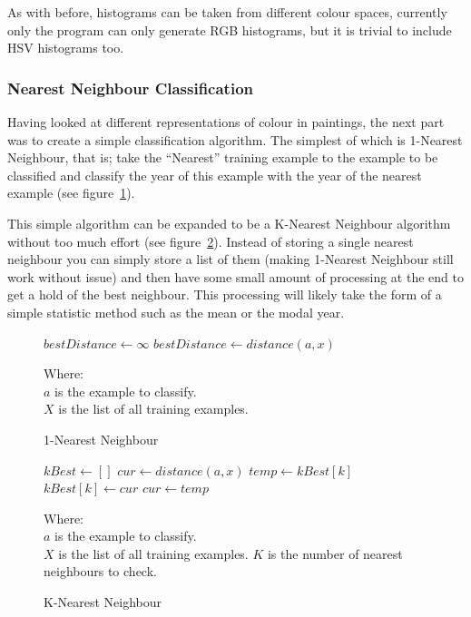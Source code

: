 \documentclass[11pt,fleqn,twoside]{article}
\begin{document}
As with before, histograms can be taken from different colour spaces, currently only the program
can only generate RGB histograms, but it is trivial to include HSV histograms too.

\subsubsection{Nearest Neighbour Classification}
Having looked at different representations of colour in paintings, the next part was to create a 
simple classification algorithm. The simplest of which is 1-Nearest Neighbour, that is; take the 
``Nearest'' training example to the example to be classified and classify the year of this example 
with the year of the nearest example (see figure~\ref{fig:1-nn}).

This simple algorithm can be expanded to be a K-Nearest Neighbour algorithm without too much effort
(see figure~\ref{fig:k-nn}). Instead of storing a single nearest neighbour you can simply store a
list of them (making 1-Nearest Neighbour still work without issue) and then have some small amount
of processing at the end to get a hold of the best neighbour. This processing will likely take the
form of a simple statistic method such as the mean or the modal year.

\begin{figure}[h]
\begin{algorithmic}
\State $bestDistance \gets \infty$
		\State $bestDistance \gets distance(a, x)$
	\EndIf
\EndFor
\end{algorithmic}

Where:\\
\(a\) is the example to classify.\\
\(X\) is the list of all training examples.
\caption{1-Nearest Neighbour}
\label{fig:1-nn}
\end{figure}

\begin{figure}[h]
\begin{algorithmic}
\State $kBest \gets []$
	\State $cur \gets distance(a, x)$
			\State $temp \gets kBest[k]$
			\State $kBest[k] \gets cur$
			\State $cur \gets temp$
		\EndIf
	\EndFor
\EndFor
\end{algorithmic}
Where:\\
$a$ is the example to classify.\\
$X$ is the list of all training examples.
$K$ is the number of nearest neighbours to check.
\caption{K-Nearest Neighbour}
\label{fig:k-nn}
\end{figure}
\end{document}
